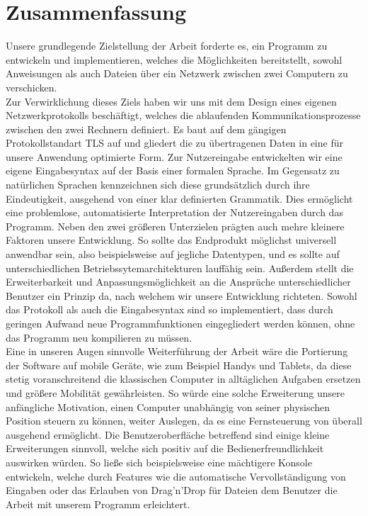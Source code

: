 \documentclass[12pt,a4paper]{scrartcl}
\begin{document}
\section*{Zusammenfassung}
Unsere grundlegende Zielstellung der Arbeit forderte es, ein Programm zu entwickeln und implementieren, welches die Möglichkeiten bereitstellt, sowohl Anweisungen als auch Dateien über ein Netzwerk zwischen zwei Computern zu verschicken.\\
Zur Verwirklichung dieses Ziels haben wir uns mit dem Design eines eigenen Netzwerkprotokolls beschäftigt, welches die ablaufenden Kommunikationsprozesse zwischen den zwei Rechnern definiert. 
Es baut auf dem gängigen Protokollstandart TLS auf und gliedert die zu übertragenen Daten in eine für unsere Anwendung optimierte Form. 
Zur Nutzereingabe entwickelten wir eine eigene Eingabesyntax auf der Basis einer formalen Sprache. 
Im Gegensatz zu natürlichen Sprachen kennzeichnen sich diese grundsätzlich durch ihre Eindeutigkeit, ausgehend von einer klar definierten Grammatik. 
Dies ermöglicht eine problemlose, automatisierte Interpretation der Nutzereingaben durch das Programm.
Neben den zwei größeren Unterzielen prägten auch mehre kleinere Faktoren unsere Entwicklung. 
So sollte das Endprodukt möglichst universell anwendbar sein, also beispielsweise auf jegliche Datentypen, und es sollte auf unterschiedlichen Betriebssytemarchitekturen lauffähig sein.
Außerdem stellt die Erweiterbarkeit und Anpassungsmöglichkeit an die Ansprüche unterschiedlicher Benutzer ein Prinzip da, nach welchem wir unsere Entwicklung richteten. 
Sowohl das Protokoll als auch die Eingabesyntax sind so implementiert, dass durch geringen Aufwand neue Programmfunktionen eingegliedert werden können, ohne das Programm neu kompilieren zu müssen.\\
Eine in unseren Augen sinnvolle Weiterführung der Arbeit wäre die Portierung der Software auf mobile Geräte, wie zum Beispiel Handys und Tablets, da diese stetig voranschreitend die klassischen Computer in alltäglichen Aufgaben ersetzen und größere Mobilität gewährleisten. 
So würde eine solche Erweiterung unsere anfängliche Motivation, einen Computer unabhängig von seiner physischen Position steuern zu können, weiter Auslegen, da es eine Fernsteuerung von überall ausgehend ermöglicht. 
Die Benutzeroberfläche betreffend sind einige kleine Erweiterungen sinnvoll, welche sich positiv auf die Bedienerfreundlichkeit auswirken würden. 
So ließe sich beispielsweise eine mächtigere Konsole entwickeln, welche durch Features wie die automatische Vervollständigung von Eingaben oder das Erlauben von Drag’n’Drop für Dateien dem Benutzer die Arbeit mit unserem Programm erleichtert.\\ 
\end{document}
